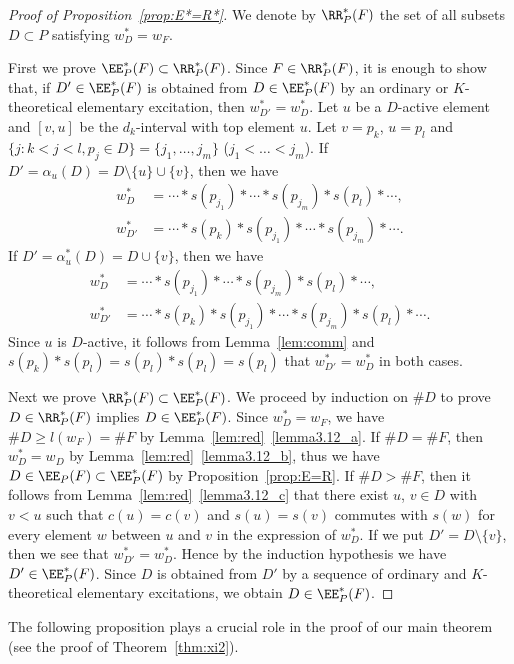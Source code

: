 \begin{proof}[Proof of Proposition~\ref{prop:E*=R*}]
We denote by $\RR^*_P(F)$ the set of all subsets $D \subset P$ satisfying $w^*_D = w_F$.

First we prove $\EE^*_P(F) \subset \RR^*_P(F)$.
Since $F \in \RR^*_P(F)$, it is enough to show that, 
if $D' \in \EE^*_P(F)$ is obtained from $D \in \EE^*_P(F)$ by an ordinary or $K$-theoretical elementary excitation, 
then $w^*_{D'} = w^*_D$.
Let $u$ be a $D$-active element and $[v,u]$ be the $d_k$-interval with top element $u$.
Let $v = p_k$, $u = p_l$ and $\{ j : k < j < l, p_j \in D \} = \{ j_1, \dots, j_m \}$ ($j_1 < \dots < j_m$).
If $D' = \alpha_u(D) = D \setminus \{ u \} \cup \{ v \}$, then we have
\begin{align*}
w^*_D &= \cdots * s(p_{j_1}) * \cdots * s(p_{j_m}) * s(p_l) * \cdots,
\\
w^*_{D'} &= \cdots * s(p_k) * s(p_{j_1}) * \cdots * s(p_{j_m}) * \cdots.
\end{align*}
If $D' = \alpha^*_u(D) = D \cup \{ v \}$, then we have
\begin{align*}
w^*_D &= \cdots * s(p_{j_1}) * \cdots * s(p_{j_m}) * s(p_l) * \cdots,
\\
w^*_{D'} &= \cdots * s(p_k) * s(p_{j_1}) * \cdots * s(p_{j_m}) * s(p_l) * \cdots.
\end{align*}
Since $u$ is $D$-active, it follows from Lemma~\ref{lem:comm} and $s(p_k)*s(p_l) = s(p_l)*s(p_l) = s(p_l)$ 
that $w^*_{D'} = w^*_D$ in both cases.

Next we prove $\RR^*_P(F) \subset \EE^*_P(F)$.
We proceed by induction on $\# D$ to prove $D \in \RR^*_P(F)$ implies $D \in \EE^*_P(F)$.
Since $w^*_D = w_F$, we have $\# D \ge l(w_F) = \# F$ by Lemma~\ref{lem:red}~\ref{lemma3.12_a}.
If $\# D = \# F$, then $w^*_D = w_D$ by Lemma~\ref{lem:red}~\ref{lemma3.12_b}, 
thus we have $D \in \EE_P(F) \subset \EE^*_P(F)$ by Proposition~\ref{prop:E=R}.
If $\# D > \# F$, then it follows from Lemma~\ref{lem:red}~\ref{lemma3.12_c} that 
there exist $u$, $v \in D$ with $v < u$ such that $c(u) = c(v)$ and 
$s(u) = s(v)$ commutes with $s(w)$ for
every element $w$ between $u$ and $v$ in the expression of $w^*_D$.
If we put $D' = D \setminus \{ v \}$, then we see that $w^*_{D'} = w^*_D$.
Hence by the induction hypothesis we have $D' \in \EE^*_P(F)$.
Since $D$ is obtained from $D'$ by a sequence of ordinary and $K$-theoretical elementary excitations, 
we obtain $D \in \EE^*_P(F)$.
\end{proof}

The following proposition plays a crucial role in the proof of our main theorem 
(see the proof of Theorem~\ref{thm:xi2}).

